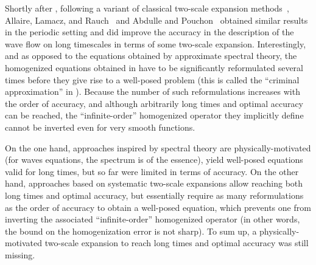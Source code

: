 \documentclass[JEP,XML,SOM,Unicode,published]{cedram}
\theoremstyle{plain}
\theoremstyle{definition}
\numberwithin{equation}{section}
\begin{document}
Shortly after \cite{BG}, following a variant of classical two-scale expansion methods~\cite{BLP-78}, Allaire, Lamacz, and Rauch~\cite{ALR} and Abdulle and Pouchon~\cite{Pouch-17,Pouch-19}
obtained similar results in the periodic setting and did improve the accuracy in the description of the wave flow on long timescales in terms of some two-scale expansion.
Interestingly, and as opposed to the equations obtained by approximate spectral theory, the homogenized equations obtained in \cite{ALR,Pouch-17,Pouch-19} have to be significantly reformulated several times before they give rise to a well-posed problem (this is called the ``criminal approximation'' in \cite{ALR}). Because the number of such reformulations increases with the order of accuracy, and although arbitrarily long times and optimal accuracy can be reached,
the ``infinite-order'' homogenized operator they implicitly define cannot be inverted even for very smooth functions.

On the one hand, approaches inspired by spectral theory are physically-motivated (for waves equations, the spectrum is of the essence), yield well-posed equations valid for long times, but so far were limited in terms of accuracy. On the other hand, approaches based on systematic two-scale expansions allow { reaching} both long times and optimal accuracy, but essentially require as many reformulations as the order of accuracy to obtain a well-posed equation, which prevents one from inverting the associated ``infinite-order'' homogenized operator (in other words, the bound on the homogenization error is not sharp).
To sum up, a physically-motivated two-scale expansion to reach long times and optimal accuracy was still missing.
\end{document}
